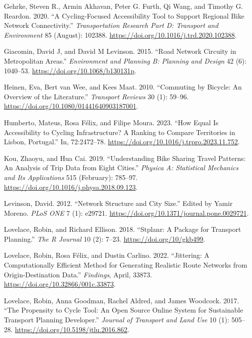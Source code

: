 \documentclass[
  sn-nature,
]{sn-jnl}
\newlength{\cslhangindent}
\newenvironment{CSLReferences}[2] %
 {\begin{list}{}{%
  \setlength{\itemindent}{0pt}
  \setlength{\leftmargin}{0pt}
  \setlength{\parsep}{0pt}
  \ifodd #1
   \setlength{\leftmargin}{\cslhangindent}
   \setlength{\itemindent}{-1\cslhangindent}
  \fi
  \setlength{\itemsep}{#2\baselineskip}}}
 {\end{list}}
\begin{document}
\begin{CSLReferences}{1}{0}
Gehrke, Steven R., Armin Akhavan, Peter G. Furth, Qi Wang, and Timothy
G. Reardon. 2020. {``A Cycling-Focused Accessibility Tool to Support
Regional Bike Network Connectivity.''} \emph{Transportation Research
Part D: Transport and Environment} 85 (August): 102388.
\url{https://doi.org/10.1016/j.trd.2020.102388}.

Giacomin, David J, and David M Levinson. 2015. {``Road Network Circuity
in Metropolitan Areas.''} \emph{Environment and Planning B: Planning and
Design} 42 (6): 1040--53. \url{https://doi.org/10.1068/b130131p}.

Heinen, Eva, Bert van Wee, and Kees Maat. 2010. {``Commuting by Bicycle:
An Overview of the Literature.''} \emph{Transport Reviews} 30 (1):
59--96. \url{https://doi.org/10.1080/01441640903187001}.

Humberto, Mateus, Rosa Félix, and Filipe Moura. 2023. {``How Equal Is
Accessibility to Cycling Infrastructure? A Ranking to Compare
Territories in Lisbon, Portugal.''} In, 72:2472--78.
\url{https://doi.org/10.1016/j.trpro.2023.11.752}.

Kou, Zhaoyu, and Hua Cai. 2019. {``Understanding Bike Sharing Travel
Patterns: An Analysis of Trip Data from Eight Cities.''} \emph{Physica
A: Statistical Mechanics and Its Applications} 515 (February): 785--97.
\url{https://doi.org/10.1016/j.physa.2018.09.123}.

Levinson, David. 2012. {``Network Structure and City Size.''} Edited by
Yamir Moreno. \emph{PLoS ONE} 7 (1): e29721.
\url{https://doi.org/10.1371/journal.pone.0029721}.

Lovelace, Robin, and Richard Ellison. 2018. {``Stplanr: A Package for
Transport Planning.''} \emph{The R Journal} 10 (2): 7--23.
\url{https://doi.org/10/gkb499}.

Lovelace, Robin, Rosa Félix, and Dustin Carlino. 2022. {``Jittering: A
Computationally Efficient Method for Generating Realistic Route Networks
from Origin-Destination Data.''} \emph{Findings}, April, 33873.
\url{https://doi.org/10.32866/001c.33873}.

Lovelace, Robin, Anna Goodman, Rachel Aldred, and James Woodcock. 2017.
{``The Propensity to Cycle Tool: An Open Source Online System for
Sustainable Transport Planning Developer.''} \emph{Journal of Transport
and Land Use} 10 (1): 505--28.
\url{https://doi.org/10.5198/jtlu.2016.862}.


\end{CSLReferences}
\end{document}
